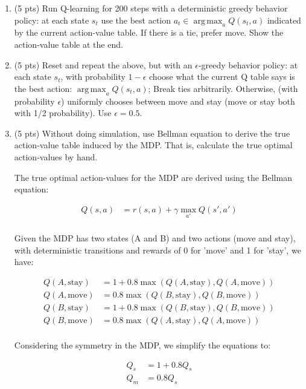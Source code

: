 \documentclass[a4paper]{article}
\theoremstyle{definition}
\DeclareMathOperator*{\argmax}{arg\,max}
\newenvironment{soln}{
    \leavevmode\color{blue}\ignorespaces
}{}
\begin{document}
\begin{enumerate}
\item (5 pts) Run Q-learning for 200 steps with a deterministic greedy behavior policy: at each state $s_t$ use the best action $a_t \in \argmax_a Q(s_t,a)$ indicated by the current action-value table. If there is a tie, prefer move. Show the action-value table at the end.

\item (5 pts) Reset and repeat the above, but with an $\epsilon$-greedy behavior policy: at each state $s_t$, with probability $1-\epsilon$ choose what the current Q table says is the best action: $\argmax_a Q(s_t,a)$; Break ties arbitrarily. Otherwise, (with probability $\epsilon$) uniformly chooses between move and stay (move or stay both with 1/2 probability). Use $\epsilon=0.5$.

\item (5 pts) Without doing simulation, use Bellman equation to derive the true action-value table induced by the MDP. That is, calculate the true optimal action-values by hand.

\begin{soln}
    The true optimal action-values for the MDP are derived using the Bellman equation:

    \begin{align*}
    Q(s, a) &= r(s, a) + \gamma \max_{a'} Q(s', a') \\
    \end{align*}

    Given the MDP has two states (A and B) and two actions (move and stay), with deterministic transitions and rewards of 0 for 'move' and 1 for 'stay', we have:

    \begin{align*}
    Q(A, \text{stay}) &= 1 + 0.8 \max(Q(A, \text{stay}), Q(A, \text{move})) \\
    Q(A, \text{move}) &= 0.8 \max(Q(B, \text{stay}), Q(B, \text{move})) \\
    Q(B, \text{stay}) &= 1 + 0.8 \max(Q(B, \text{stay}), Q(B, \text{move})) \\
    Q(B, \text{move}) &= 0.8 \max(Q(A, \text{stay}), Q(A, \text{move})) \\
    \end{align*}

    Considering the symmetry in the MDP, we simplify the equations to:

    \begin{align*}
    Q_s &= 1 + 0.8 Q_s \\
    Q_m &= 0.8 Q_s \\
    \end{align*}


\end{soln}
\end{enumerate}
\end{document}

